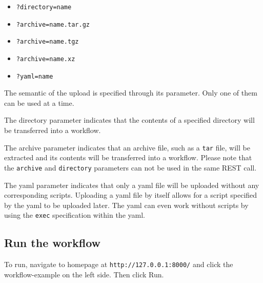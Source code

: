 \begin{itemize}
\tightlist
\item
  \texttt{?directory=name}
\item
  \texttt{?archive=name.tar.gz}
\item
  \texttt{?archive=name.tgz}
\item
  \texttt{?archive=name.xz}
\item
  \texttt{?yaml=name}
\end{itemize}

The semantic of the upload is specified through its parameter. Only one
of them can be used at a time.

The directory parameter indicates that the contents of a specified
directory will be transferred into a workflow.

The archive parameter indicates that an archive file, such as a
\texttt{tar} file, will be extracted and its contents will be
transferred into a workflow. Please note that the \texttt{archive} and
\texttt{directory} parameters can not be used in the same REST call.

The yaml parameter indicates that only a yaml file will be uploaded
without any corresponding scripts. Uploading a yaml file by itself
allows for a script specified by the yaml to be uploaded later. The yaml
can even work without scripts by using the \texttt{exec} specification
within the yaml.

\hypertarget{run-the-workflow}{%
\subsection{Run the workflow}\label{run-the-workflow}}

To run, navigate to homepage at \texttt{http://127.0.0.1:8000/} and
click the workflow-example on the left side. Then click Run.
